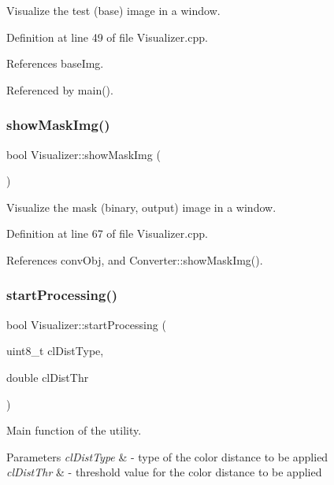 Visualize the test (base) image in a window. 



Definition at line 49 of file Visualizer.\+cpp.



References base\+Img.



Referenced by main().

\mbox{\label{class_visualizer_ac7312a98d67cd0cc8f3d7e99fb5cfca9}} 
\subsubsection{\texorpdfstring{showMaskImg()}{showMaskImg()}}
{\footnotesize\ttfamily bool Visualizer\+::show\+Mask\+Img (\begin{DoxyParamCaption}{ }\end{DoxyParamCaption})}



Visualize the mask (binary, output) image in a window. 



Definition at line 67 of file Visualizer.\+cpp.



References conv\+Obj, and Converter\+::show\+Mask\+Img().

\mbox{\label{class_visualizer_ac32b38bcdeeeeb584b7a711ab4b1f5aa}} 
\subsubsection{\texorpdfstring{startProcessing()}{startProcessing()}}
{\footnotesize\ttfamily bool Visualizer\+::start\+Processing (\begin{DoxyParamCaption}\item[{uint8\+\_\+t}]{cl\+Dist\+Type,  }\item[{double}]{cl\+Dist\+Thr }\end{DoxyParamCaption})}



Main function of the utility. 


\begin{DoxyParams}{Parameters}
{\em cl\+Dist\+Type} & -\/ type of the color distance to be applied \\
\hline
{\em cl\+Dist\+Thr} & -\/ threshold value for the color distance to be applied \\
\hline
\end{DoxyParams}


